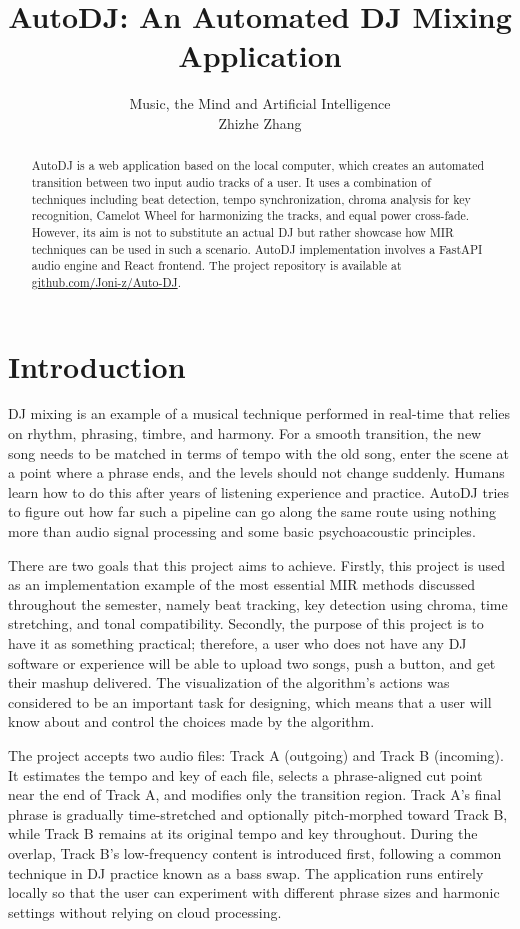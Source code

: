 \documentclass[11pt]{article}
\title{AutoDJ: An Automated DJ Mixing Application}
\author{Music, the Mind and Artificial Intelligence \\ Zhizhe Zhang}
\begin{document}
    \maketitle

    \begin{abstract}
        AutoDJ is a web application based on the local computer, which creates an automated transition between two input audio tracks of a user. It uses a combination of techniques including beat detection, tempo synchronization, chroma analysis for key recognition, Camelot Wheel for harmonizing the tracks, and equal power cross-fade. However, its aim is not to substitute an actual DJ but rather showcase how MIR techniques can be used in such a scenario. AutoDJ implementation involves a FastAPI audio engine and React frontend. The project repository is available at \href{https://github.com/Joni-z/Auto-DJ}{github.com/Joni-z/Auto-DJ}.
    \end{abstract}

    \section{Introduction}
    DJ mixing is an example of a musical technique performed in real-time that relies on rhythm, phrasing, timbre, and harmony. For a smooth transition, the new song needs to be matched in terms of tempo with the old song, enter the scene at a point where a phrase ends, and the levels should not change suddenly. Humans learn how to do this after years of listening experience and practice. AutoDJ tries to figure out how far such a pipeline can go along the same route using nothing more than audio signal processing and some basic psychoacoustic principles.

    There are two goals that this project aims to achieve. Firstly, this project is used as an implementation example of the most essential MIR methods discussed throughout the semester, namely beat tracking, key detection using chroma, time stretching, and tonal compatibility. Secondly, the purpose of this project is to have it as something practical; therefore, a user who does not have any DJ software or experience will be able to upload two songs, push a button, and get their mashup delivered. The visualization of the algorithm's actions was considered to be an important task for designing, which means that a user will know about and control the choices made by the algorithm.

    The project accepts two audio files: Track A (outgoing) and Track B (incoming). It estimates the tempo and key of each file, selects a phrase-aligned cut point near the end of Track A, and modifies only the transition region. Track A's final phrase is gradually time-stretched and optionally pitch-morphed toward Track B, while Track B remains at its original tempo and key throughout. During the overlap, Track B's low-frequency content is introduced first, following a common technique in DJ practice known as a bass swap. The application runs entirely locally so that the user can experiment with different phrase sizes and harmonic settings without relying on cloud processing.
\end{document}
